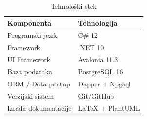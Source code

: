 \begin{table}[H]
    \centering
    \begin{tabularx}{\textwidth}{|l|l|}
        \hline
        \textbf{Komponenta} & \textbf{Tehnologija} \\
        \hline
        Programski jezik & C\# 12 \\
        \hline
        Framework & .NET 10 \\
        \hline
        UI Framework & Avalonia 11.3 \\
        \hline
        Baza podataka & PostgreSQL 16 \\
        \hline
        ORM / Data pristup & Dapper + Npgsql \\
        \hline
        Verzijski sistem & Git/GitHub \\
        \hline
        Izrada dokumentacije & \LaTeX{} + PlantUML \\
        \hline
    \end{tabularx}
    \caption{Tehnološki stek}
    \label{tab:tech-stack}
\end{table}
